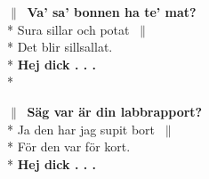 \begin{SongText}[Kalmarevisan]
\begin{SongVerse}
    \end{SongVerse}
    \begin{SongVerse}
        $\|\:$ \textbf{Va’ sa’ bonnen ha te’ mat?}\\*%
        Sura sillar och potat $\:\|$\\*%
        Det blir sillsallat.\\*%
        \textbf{Hej dick . . .}\\*%
    \end{SongVerse}
    \begin{SongVerse}
        $\|\:$ \textbf{Säg var är din labbrapport?}\\*%
        Ja den har jag supit bort $\:\|$\\*%
        För den var för kort.\\*%
        \textbf{Hej dick . . .}
    \end{SongVerse}
\end{SongText}
